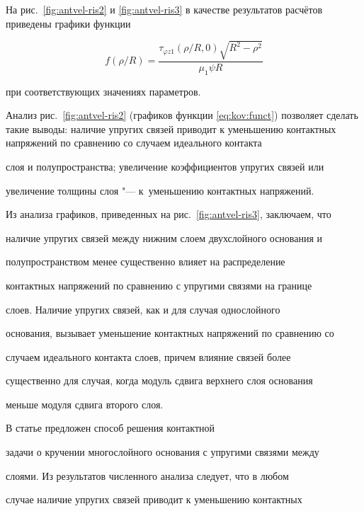 На рис.~\ref{fig:antvel-ris2} и \ref{fig:antvel-ris3} в качестве результатов расчётов приведены графики функции 

\begin{equation}

\label{eq:kov:funct}

f({\rho}/{R})=\frac{\tau_{\varphi z1}({\rho}/{R}, 0)\sqrt{R^2-\rho^{2}}}{\mu_{1}\psi R}

\end{equation}

при соответствующих значениях параметров.





Анализ рис.~\ref{fig:antvel-ris2} (графиков функции \eqref{eq:kov:funct}) позволяет сделать такие выводы: наличие упругих связей приводит к уменьшению контактных напряжений по сравнению со случаем идеального контакта

слоя и полупространства; увеличение коэффициентов упругих связей или

увеличение толщины слоя "--- к~уменьшению контактных напряжений. 

Из анализа графиков, приведенных на рис.~\ref{fig:antvel-ris3}, заключаем, что

наличие упругих связей между нижним слоем двухслойного основания и

полупространством менее существенно влияет на распределение

контактных напряжений по сравнению с упругими связями на границе

слоев. Наличие упругих связей, как и для случая однослойного

основания, вызывает уменьшение контактных напряжений по сравнению со

случаем идеального контакта слоев, причем влияние связей более

существенно для случая, когда модуль сдвига верхнего слоя основания

меньше модуля сдвига второго слоя.



\smallskip



 В статье предложен способ решения контактной

задачи о кручении многослойного основания с упругими связями между

слоями. Из результатов численного анализа следует, что в любом

случае наличие упругих связей приводит к уменьшению контактных

